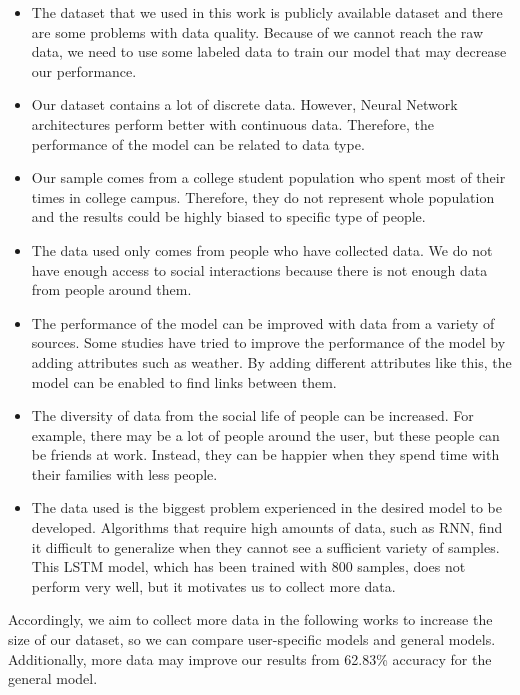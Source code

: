 \documentclass[12pt,oneandhalf,chaparabic,lfm,phd,eng,oneside,pntc]{gsufbe}
\begin{document}
\begin{itemize}
  \item The dataset that we used in this work is publicly available dataset and there are some problems with data quality. Because of we cannot reach the raw data, we need to use some labeled data to train our model that may decrease our performance.
  \item Our dataset contains a lot of discrete data. However, Neural Network architectures perform better with continuous data. Therefore, the performance of the model can be related to data type.
  \item Our sample comes from a college student population who spent most of their times in college campus. Therefore, they do not represent whole population and the results could be highly biased to specific type of people.
  \item The data used only comes from people who have collected data. We do not have enough access to social interactions because there is not enough data from people around them.
  \item The performance of the model can be improved with data from a variety of sources. Some studies have tried to improve the performance of the model by adding attributes such as weather. By adding different attributes like this, the model can be enabled to find links between them.
  \item The diversity of data from the social life of people can be increased. For example, there may be a lot of people around the user, but these people can be friends at work. Instead, they can be happier when they spend time with their families with less people.
  \item The data used is the biggest problem experienced in the desired model to be developed. Algorithms that require high amounts of data, such as RNN, find it difficult to generalize when they cannot see a sufficient variety of samples. This LSTM model, which has been trained with 800 samples, does not perform very well, but it motivates us to collect more data.
\end{itemize}

Accordingly, we aim to collect more data in the following works to increase the size of our dataset, so we can compare user-specific models and general models. Additionally, more data may improve our results from 62.83\% accuracy for the general model. 
\end{document}
